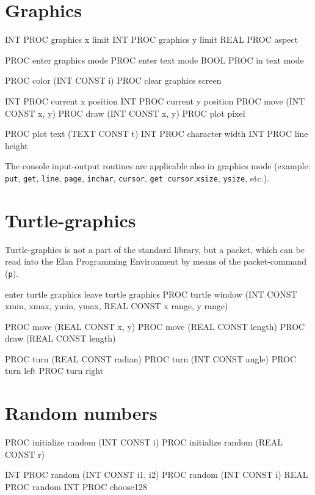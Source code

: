 \section{Graphics}

\begin{elan}
INT PROC graphics x limit
INT PROC graphics y limit
REAL PROC aspect

PROC enter graphics mode
PROC enter text mode
BOOL PROC in text mode

PROC color (INT CONST i)
PROC clear graphics screen

INT PROC current x position
INT PROC current y position
PROC move (INT CONST x, y)
PROC draw (INT CONST x, y)
PROC plot pixel

PROC plot text (TEXT CONST t)
INT PROC character width
INT PROC line height
\end{elan}

\noindent
The console input-output routines are applicable also in graphics
mode (example: {\tt put}, {\tt get}, {\tt line}, {\tt page},
{\tt inchar}, {\tt cursor}, {\tt get cursor},{\tt xsize},
{\tt ysize}, etc.).

\section{Turtle-graphics}

Turtle-graphics is not a part of the standard library, but
a packet, which can be read into the Elan Programming Environment
by means of the packet-command ({\tt p}).

\begin{elan}
     enter turtle graphics
     leave turtle graphics
PROC turtle window (INT CONST xmin, xmax, ymin, ymax,
                    REAL CONST x range, y range)

PROC move (REAL CONST x, y)
PROC move (REAL CONST length)
PROC draw (REAL CONST length)

PROC turn (REAL CONST radian)
PROC turn (INT CONST angle)
PROC turn left
PROC turn right
\end{elan}

\section{Random numbers}

\begin{elan}
PROC initialize random (INT CONST i)
PROC initialize random (REAL CONST r)

INT PROC random (INT CONST i1, i2)
PROC random (INT CONST i)
REAL PROC random
INT PROC choose128
\end{elan}

